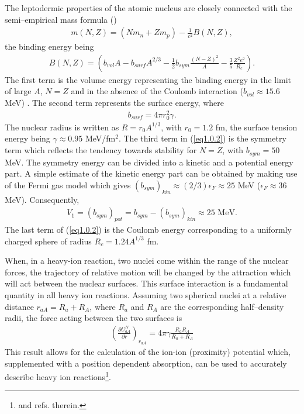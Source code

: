 \documentclass[a4paper,11pt]{book}
\numberwithin{equation}{section}
\numberwithin{figure}{section}
\numberwithin{table}{section}
\begin{document}
The leptodermic properties of the atomic nucleus are closely connected with the semi--empirical mass formula (\cite{Weizsacker:35})
\begin{align}
m(N,Z)=(Nm_n+Zm_p)-\frac{1}{c^2}B(N,Z),
\end{align}
the binding energy being
\begin{align}\label{eq1.0.2}
B(N,Z)=\left(b_{vol}A-b_{surf}A^{2/3}-\frac{1}{2} b_{sym}\frac{(N-Z)^2}{A}-\frac{3}{5}\frac{Z^2e^2}{R_c}\right).
\end{align}
The first term is the volume energy representing the binding energy in the limit of large $A$, $N=Z$ and in the absence of the Coulomb interaction ($b_{vol}\approx15.6$ MeV) . The second term represents the surface energy, where
\begin{align}\label{eq1.0.3}
b_{surf}=4\pi r_0^2\gamma.
\end{align}
The nuclear radius is written as $R=r_0A^{1/3}$, with $r_0=1.2$ fm, the surface tension energy being $\gamma\approx 0.95$ MeV/fm$^2$. 
The third term in (\ref{eq1.0.2}) is the symmetry term which reflects the tendency towards stability for $N=Z$, with $b_{sym}=50$ MeV. The symmetry energy can be divided into a kinetic and a potential energy part. A simple estimate of the kinetic energy part can be obtained by making use of the Fermi gas model which gives $(b_{sym})_{kin}\approx(2/3)\epsilon_F\approx25$ MeV ($\epsilon_F\approx 36$ MeV). Consequently,
\begin{align}\label{eq1.0.4bis}
V_1=(b_{sym})_{pot}=b_{sym}-(b_{sym})_{kin}\approx 25\text{ MeV}.
\end{align}
The last term of (\ref{eq1.0.2}) is the Coulomb energy corresponding to a uniformly charged sphere of radius $R_c=1.24A^{1/3}$ fm.


When, in a heavy-ion reaction,  two nuclei come within the range of the nuclear forces, the trajectory of relative motion will be changed by the attraction which will act between the nuclear surfaces. This surface interaction is a fundamental quantity in all heavy ion reactions. Assuming two spherical nuclei at a relative distance $r_{aA}=R_a+R_A$, where $R_a$ and $R_A$ are the corresponding half--density radii, the force acting between the two surfaces is
\begin{align}\label{eq1.0.4}
\left(\frac{\partial U_{aA}^N}{\partial r}\right)_{r_{aA}}=4\pi \gamma\frac{R_aR_A}{R_a+R_A}
\end{align}
This result allows for the calculation of the ion-ion (proximity) potential which, supplemented with a position dependent absorption, can be used to accurately describe heavy ion reactions\footnote{\cite{Broglia:04a} and refs. therein.}.
\end{document}
